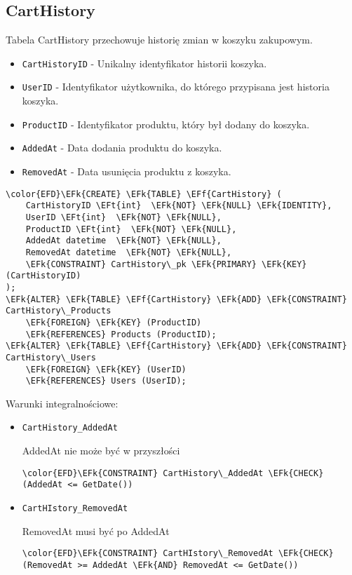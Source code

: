 \documentclass[11pt]{article}
\newcommand{\EFk}[1]{\textcolor{EFk}{\textbf{#1}}} %
\newcommand{\EFf}[1]{\textcolor{EFf}{#1}} %
\newcommand{\EFt}[1]{\textcolor{EFt}{\textbf{#1}}} %
\begin{document}
\subsection{CartHistory}
\label{sec:orgf07c53a}
Tabela CartHistory przechowuje historię zmian w koszyku zakupowym.
\begin{itemize}
\item \texttt{CartHistoryID} - Unikalny identyfikator historii koszyka.
\item \texttt{UserID} - Identyfikator użytkownika, do którego przypisana jest historia koszyka.
\item \texttt{ProductID} - Identyfikator produktu, który był dodany do koszyka.
\item \texttt{AddedAt} - Data dodania produktu do koszyka.
\item \texttt{RemovedAt} - Data usunięcia produktu z koszyka.
\end{itemize}
\begin{Code}
\begin{Verbatim}
\color{EFD}\EFk{CREATE} \EFk{TABLE} \EFf{CartHistory} (
    CartHistoryID \EFt{int}  \EFk{NOT} \EFk{NULL} \EFk{IDENTITY},
    UserID \EFt{int}  \EFk{NOT} \EFk{NULL},
    ProductID \EFt{int}  \EFk{NOT} \EFk{NULL},
    AddedAt datetime  \EFk{NOT} \EFk{NULL},
    RemovedAt datetime  \EFk{NOT} \EFk{NULL},
    \EFk{CONSTRAINT} CartHistory\_pk \EFk{PRIMARY} \EFk{KEY}  (CartHistoryID)
);
\EFk{ALTER} \EFk{TABLE} \EFf{CartHistory} \EFk{ADD} \EFk{CONSTRAINT} CartHistory\_Products
    \EFk{FOREIGN} \EFk{KEY} (ProductID)
    \EFk{REFERENCES} Products (ProductID);
\EFk{ALTER} \EFk{TABLE} \EFf{CartHistory} \EFk{ADD} \EFk{CONSTRAINT} CartHistory\_Users
    \EFk{FOREIGN} \EFk{KEY} (UserID)
    \EFk{REFERENCES} Users (UserID);
\end{Verbatim}
\end{Code}
Warunki integralnościowe:


\begin{itemize}
\item \texttt{CartHistory\_AddedAt}

AddedAt nie może być w przyszłości
\begin{Code}
\begin{Verbatim}
\color{EFD}\EFk{CONSTRAINT} CartHistory\_AddedAt \EFk{CHECK}
(AddedAt <= GetDate())
\end{Verbatim}
\end{Code}
\item \texttt{CartHIstory\_RemovedAt}

RemovedAt musi być po AddedAt
\begin{Code}
\begin{Verbatim}
\color{EFD}\EFk{CONSTRAINT} CartHIstory\_RemovedAt \EFk{CHECK}
(RemovedAt >= AddedAt \EFk{AND} RemovedAt <= GetDate())
\end{Verbatim}
\end{Code}
\end{itemize}
\end{document}
